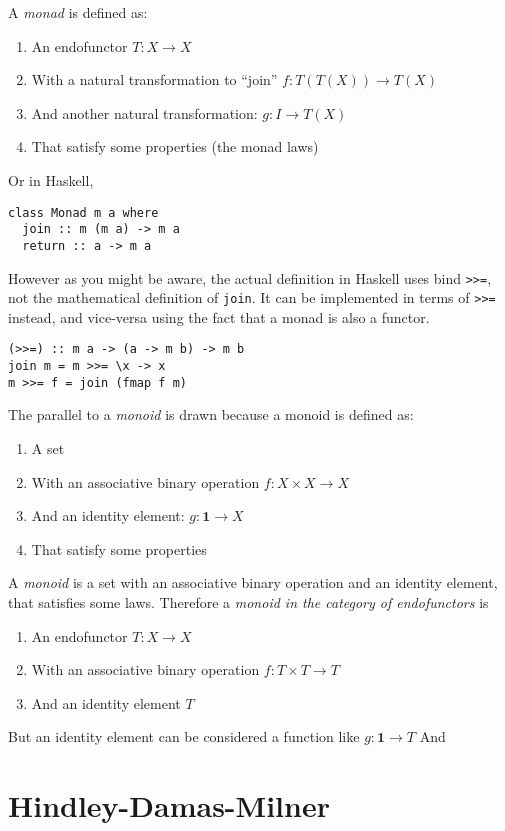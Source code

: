 A \textit{monad} is defined as:
\begin{enumerate}
\item An endofunctor $T : X \rightarrow X$
\item With a natural transformation to ``join'' $f : T(T(X)) \rightarrow T(X)$
\item And another natural transformation: $g : I \rightarrow T(X)$
\item That satisfy some properties (the monad laws)
\end{enumerate}

Or in Haskell,
\begin{verbatim}
class Monad m a where
  join :: m (m a) -> m a
  return :: a -> m a
\end{verbatim}
However as you might be aware, the actual definition in Haskell uses
bind \texttt{>>=}, not the mathematical definition of
\texttt{join}. It can be implemented in terms of
\texttt{>>=} instead, and vice-versa using the fact that
a monad is also a functor.
\begin{verbatim}
(>>=) :: m a -> (a -> m b) -> m b
join m = m >>= \x -> x
m >>= f = join (fmap f m)
\end{verbatim}

The parallel to a \textit{monoid} is drawn because a monoid is defined as:
\begin{enumerate}
\item A set
\item With an associative binary operation $f : X \times X \rightarrow X$
\item And an identity element: $g : \mathbf{1} \rightarrow X$
\item That satisfy some properties
\end{enumerate}

A \textit{monoid} is a set with an associative binary operation and an
identity element, that satisfies some laws.
Therefore a \textit{monoid in the category of
  endofunctors} is
\begin{enumerate}
\item An endofunctor $T : X \rightarrow X$
\item With an associative binary operation $f : T \times T \rightarrow T$
\item And an identity element $T$
\end{enumerate}
But an identity element can be considered a function like $g :
\mathbf{1} \rightarrow T$
And 

\section{Hindley-Damas-Milner}

